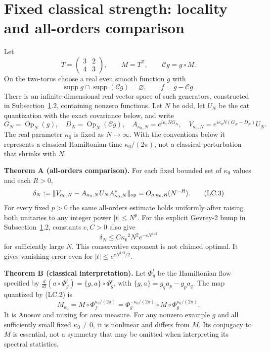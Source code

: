 \section{Fixed classical strength: locality and all-orders comparison}\label{sec:locality}
Let \[
 T=\begin{pmatrix}3&2\\4&3\end{pmatrix},\qquad M=T^{\mathsf T},\qquad
 \mathcal Cg=g\circ M.
\] On the two-torus choose a real even smooth function \(g\) with \[
 \operatorname{supp}g\cap\operatorname{supp}(\mathcal Cg)=\varnothing,
 \qquad f=g-\mathcal Cg.                                      \tag{LC.1}
\] There is an infinite-dimensional real vector space of such generators, constructed in Subsection~\ref{sec:locality}.2, containing nonzero functions. Let \(N\) be odd, let \(U_N\) be the cat quantization with the exact covariance below, and write \[
 G_N=\operatorname{Op}_N(g),\quad D_N=\operatorname{Op}_N(\mathcal Cg),
 \quad A_{{\kappa_0},N}=e^{i{\kappa_0} NG_N},\quad
 V_{{\kappa_0},N}=e^{i{\kappa_0} N(G_N-D_N)}U_N.                       \tag{LC.2}
\] The real parameter \({\kappa_0}\) is fixed as \(N\to\infty\). With the conventions below it represents a classical Hamiltonian time \({\kappa_0}/(2\pi)\), not a classical perturbation that shrinks with \(N\).

\textbf{Theorem A (all-orders comparison).} For each fixed bounded set of \({\kappa_0}\) values and each \(R>0\), \[
 \delta_N:=\|V_{{\kappa_0},N}-A_{{\kappa_0},N}U_NA_{{\kappa_0},N}^*\|_{\rm op}
       =O_{g,{\kappa_0},R}(N^{-R}).                              \tag{LC.3}
\] For every fixed \(p>0\) the same all-orders estimate holds uniformly after raising both unitaries to any integer power \(|t|\leq N^p\). For the explicit Gevrey-2 bump in Subsection~\ref{sec:locality}.2, constants \(c,C>0\) also give \[
 \delta_N\leq C{\kappa_0}^2N^2e^{-cN^{1/3}}                      \tag{LC.4}
\] for sufficiently large \(N\). This conservative exponent is not claimed optimal. It gives vanishing error even for \(|t|\leq e^{cN^{1/3}/2}\).

\textbf{Theorem B (classical interpretation).} Let \(\Phi_g^t\) be the Hamiltonian flow specified by \(\frac{d}{dt}(a\circ\Phi_g^t)=\{g,a\}\circ\Phi_g^t\), with \(\{g,a\}=g_q a_p-g_p a_q\). The map quantized by (LC.2) is \[
 M_{\kappa_0}=M\circ\Phi_f^{{\kappa_0}/(2\pi)}
 =\Phi_g^{-{\kappa_0}/(2\pi)}\circ M\circ\Phi_g^{{\kappa_0}/(2\pi)}. \tag{LC.5}
\] It is Anosov and mixing for area measure. For any nonzero example \(g\) and all sufficiently small fixed \({\kappa_0}\ne0\), it is nonlinear and differs from \(M\). Its conjugacy to \(M\) is essential, not a symmetry that may be omitted when interpreting its spectral statistics.

